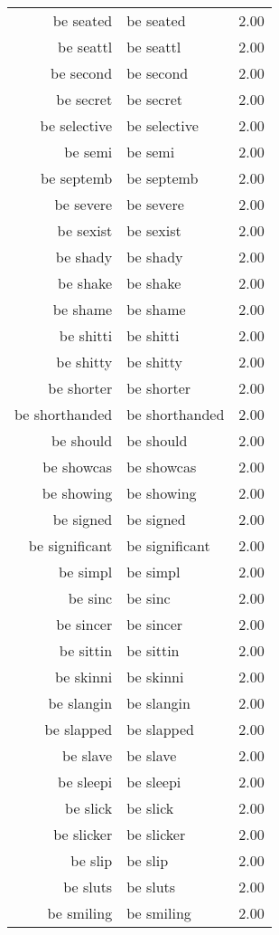 \begin{table}[ht]
\begin{tabular}{rlr}
  be seated & be seated & 2.00 \\ 
  be seattl & be seattl & 2.00 \\ 
  be second & be second & 2.00 \\ 
  be secret & be secret & 2.00 \\ 
  be selective & be selective & 2.00 \\ 
  be semi & be semi & 2.00 \\ 
  be septemb & be septemb & 2.00 \\ 
  be severe & be severe & 2.00 \\ 
  be sexist & be sexist & 2.00 \\ 
  be shady & be shady & 2.00 \\ 
  be shake & be shake & 2.00 \\ 
  be shame & be shame & 2.00 \\ 
  be shitti & be shitti & 2.00 \\ 
  be shitty & be shitty & 2.00 \\ 
  be shorter & be shorter & 2.00 \\ 
  be shorthanded & be shorthanded & 2.00 \\ 
  be should & be should & 2.00 \\ 
  be showcas & be showcas & 2.00 \\ 
  be showing & be showing & 2.00 \\ 
  be signed & be signed & 2.00 \\ 
  be significant & be significant & 2.00 \\ 
  be simpl & be simpl & 2.00 \\ 
  be sinc & be sinc & 2.00 \\ 
  be sincer & be sincer & 2.00 \\ 
  be sittin & be sittin & 2.00 \\ 
  be skinni & be skinni & 2.00 \\ 
  be slangin & be slangin & 2.00 \\ 
  be slapped & be slapped & 2.00 \\ 
  be slave & be slave & 2.00 \\ 
  be sleepi & be sleepi & 2.00 \\ 
  be slick & be slick & 2.00 \\ 
  be slicker & be slicker & 2.00 \\ 
  be slip & be slip & 2.00 \\ 
  be sluts & be sluts & 2.00 \\ 
  be smiling & be smiling & 2.00 \\ 

\end{tabular}
\end{table}
